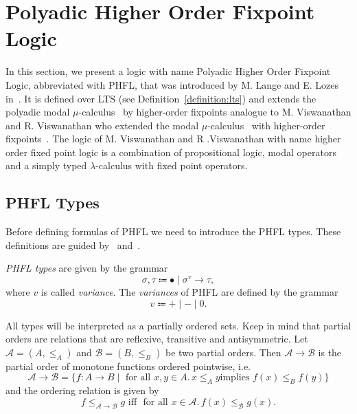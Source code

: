 
\section{Polyadic Higher Order Fixpoint Logic}\label{sec:polyadichigherorderfixpointlogic}

In this section, we present a logic with name Polyadic Higher Order Fixpoint Logic, abbreviated with PHFL, that was
introduced by M. Lange and E. Lozes in~\cite{lange2014capturing}. It is defined over LTS (see
Definition~\ref{definition:lts}) and extends the polyadic modal $\mu$-calculus~\cite{otto1999bisimulation} by
higher-order fixpoints analogue to M. Viswanathan and R. Viswanathan who extended the modal
$\mu$-calculus~\cite{kozen1983results} with higher-order fixpoints~\cite{viswanathan2004higher}. The logic of M. Viswanathan and R
.Viswanathan with name higher order fixed point logic is a combination of propositional logic, modal operators and
a simply typed $\lambda$-calculus with fixed point operators. 

\subsection{PHFL Types}\label{subsec:phflTypes}

Before defining formulas of PHFL we need to introduce the PHFL types. These definitions are guided
by~\cite{viswanathan2004higher} and~\cite{lange2014capturing}.

\begin{definition}
    \emph{PHFL types} are given by the grammar
    \[\sigma, \tau \Coloneqq \bullet \mid \sigma^v \rightarrow \tau,\]
    where $v$ is called \textit{variance}. The \emph{variances} of PHFL are defined by the grammar
    \[v \Coloneqq + \mid - \mid 0.\]
\end{definition}

All types will be interpreted as a partially ordered sets. Keep in mind that partial orders are relations that are reflexive, transitive
and antisymmetric. Let $\mathcal{A} = (A, \leq_A)$ and $\mathcal{B} = (B, \leq_B)$ be two partial orders. Then
$\mathcal{A} \rightarrow \mathcal{B}$ is the partial order of monotone functions ordered pointwise, i.e.
\[\mathcal{A} \rightarrow \mathcal{B} = \{f\colon A\rightarrow B \mid \text{ for all } x,y \in A.\,x\leq_A y \text{
implies }
f(x)
\leq_B f(y)\}\]
and the ordering relation is given by
\[f \leq_{\mathcal{A}\rightarrow\mathcal{B}} g\text{ iff } \text{ for all } x\in \mathcal{A}.\,f(x) \leq_{\mathcal{B}} g
(x).\]

